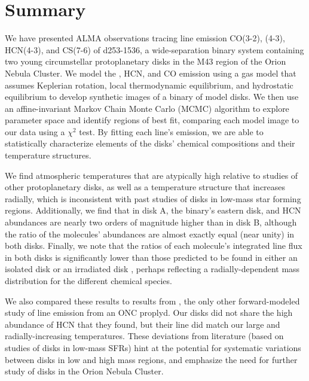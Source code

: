 \chapter{Summary}
\label{chap:Summary}


We have presented ALMA observations tracing line emission CO(3-2), \hco(4-3), HCN(4-3), and CS(7-6) of d253-1536, a wide-separation binary system containing two young circumstellar protoplanetary disks in the M43 region of the Orion Nebula Cluster. We model the \hco, HCN, and CO emission using a gas model that assumes Keplerian rotation, local thermodynamic equilibrium, and hydrostatic equilibrium to develop synthetic images of a binary of model disks. We then use an affine-invariant Markov Chain Monte Carlo (MCMC) algorithm to explore parameter space and identify regions of best fit, comparing each model image to our data using a $\chi^2$ test. By fitting each line's emission, we are able to statistically characterize elements of the disks' chemical compositions and their temperature structures.

We find atmospheric temperatures that are atypically high relative to studies of other protoplanetary disks, as well as a temperature structure that increases radially, which is inconsistent with past studies of disks in low-mass star forming regions. Additionally, we find that in disk A, the binary's eastern disk, \hco and HCN abundances are nearly two orders of magnitude higher than in disk B, although the ratio of the molecules' abundances are almost exactly equal (near unity) in both disks. Finally, we note that the ratios of each molecule's integrated line flux in both disks is significantly lower than those predicted to be found in either an isolated disk or an irradiated disk \citep{Walsh2013}, perhaps reflecting a radially-dependent mass distribution for the different chemical species.

We also compared these results to results from \citet{Factor2017}, the only other forward-modeled study of line emission from an ONC proplyd. Our disks did not share the high abundance of HCN that they found, but their \hco line did match our large and radially-increasing temperatures. These deviations from literature (based on studies of disks in low-mass SFRs) hint at the potential for systematic variations between disks in low and high mass regions, and emphasize the need for further study of disks in the Orion Nebula Cluster.


